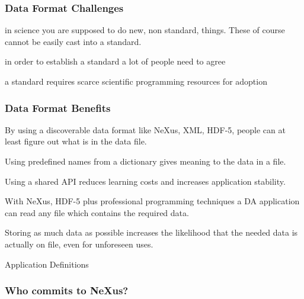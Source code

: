 \documentclass{beamer}
\begin{document}
\begin{frame} \frametitle{Data Format Challenges}
\begin{description}
\item<1->[Challenge 1] in science you are supposed to do new, non standard, things.  
 These of course cannot be easily cast into a standard.
\item<2->[Challenge 2] in order to establish a standard a lot of people need to agree
\item<3->[Challenge 3] a standard requires scarce scientific  programming resources for adoption 
\end{description}
\end{frame}

\begin{frame} \frametitle{Data Format Benefits}
\begin{description}
\item<1->[Benefit 1] By using a discoverable data format like NeXus, XML, HDF-5, people can at 
 least figure out  what is in the data file. 
\item<2->[Benefit 2] Using predefined names from a dictionary gives meaning to the data in a file.
\item<3->[Benefit 3] Using a shared API reduces learning costs and increases application stability.
\item<4->[Benefit 4] With NeXus, HDF-5 plus professional programming techniques a DA application can 
 read any file which contains the required data.
\item<5->[Benefit 5] Storing as much data as possible increases the likelihood that the needed 
 data is actually on file, even for unforeseen uses. 
\item<6->[Benefit 6] Application Definitions
\end{description}
\end{frame}


\begin{frame} \frametitle{Who commits to NeXus? }
\begin{figure}[!ht]
\end{figure}
\end{frame}
\end{document}
